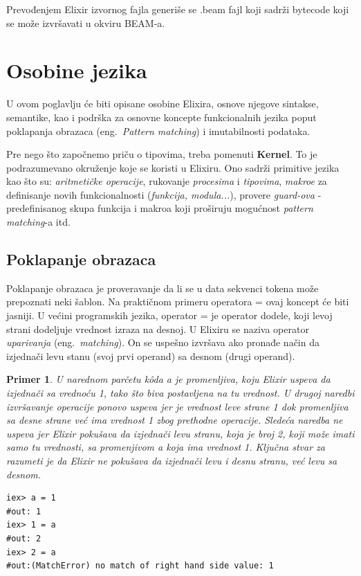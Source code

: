 \documentclass[a4paper]{article}
\newtheorem{primer}{Primer}[section]
\begin{document}
Prevođenjem Elixir izvornog fajla generiše se .beam fajl koji sadrži bytecode koji se može izvršavati u okviru BEAM-a.

\section{Osobine jezika} 
\label{sec:osobine}
U ovom poglavlju će biti opisane osobine Elixira, osnove njegove sintakse, semantike, kao i podrška za osnovne koncepte funkcionalnih jezika poput poklapanja obrazaca (eng.~{\em Pattern matching}) i imutabilnosti podataka. \cite{knjigaElixir}\cite{knjigaElixir2}

Pre nego što započnemo priču o tipovima, treba pomenuti \textbf{Kernel}. To je podrazumevano okruženje koje se koristi u Elixiru. Ono sadrži primitive jezika kao što su: \textit{aritmetičke operacije}, rukovanje \textit{procesima} i \textit{tipovima}, \textit{makroe} za definisanje novih funkcionalnosti (\textit{funkcija, modula...}), provere \textit{guard-ova} - predefinisanog skupa funkcija i makroa koji proširuju mogućnost \textit{pattern matching}-a itd.\cite{siteElixir} 

\subsection{Poklapanje obrazaca}
\label{sec:pattern}
Poklapanje obrazaca je proveravanje da li se u data sekvenci tokena može prepoznati neki šablon. Na praktičnom primeru operatora = ovaj koncept će biti jasniji. 
U većini programskih jezika, operator = je operator dodele, koji levoj strani dodeljuje vrednost izraza na desnoj. U Elixiru se naziva operator \textit{uparivanja} (eng.~{\em matching}). On se uspešno izvršava ako pronađe način da izjednači levu stanu (svoj prvi operand) sa desnom (drugi operand).
\begin{primer}
U narednom parčetu kôda \textit{a} je promenljiva, koju Elixir uspeva da izjednači sa vrednoću 1, tako što biva postavljena na tu vrednost. U drugoj naredbi izvršavanje operacije ponovo uspeva jer je vrednost leve strane 1 dok promenljiva sa desne strane već ima vrednost 1 zbog prethodne operacije. Sledeća naredba ne uspeva jer Elixir pokušava da izjednači levu stranu, koja je broj 2, koji može imati samo tu vrednosti, sa promenjivom \textit{a} koja ima vrednost 1. Ključna stvar za razumeti je da Elixir ne pokušava da izjednači levu \textit{i} desnu stranu, već levu \textit{sa} desnom.
\end{primer}
\begin{lstlisting}[caption={Primer jednostavnog poklapanja obrazaca},frame=none, label=simple]
iex> a = 1
#out: 1
iex> 1 = a
#out: 2
iex> 2 = a
#out:(MatchError) no match of right hand side value: 1
\end{lstlisting}
\end{document}
